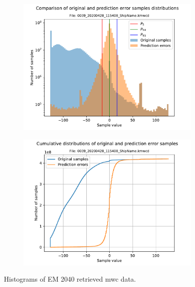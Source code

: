 \begin{figure}[h!]
	\centering
	\begin{subfigure}{0.45\textwidth}
		\centering
		\includegraphics[width=\linewidth]{images/kmall_hists/0039_20200428_115408_ShipName.kmwcd_hist.pdf}
	\end{subfigure}%
	\begin{subfigure}{0.45\textwidth}
		\centering
		\includegraphics[width=\linewidth]{images/kmall_hists/0039_20200428_115408_ShipName.kmwcd_hist_cum.pdf}
	\end{subfigure}
	\caption{Histograms of EM 2040 retrieved \acrshort{mwc} data.}
	\label{fig:0039_kmall}
\end{figure}